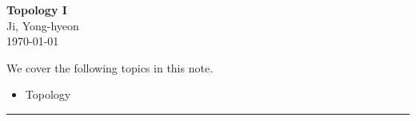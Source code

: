 \documentclass[11pt,openany]{article}
\begin{document}
\begin{center}
	\huge\textbf{Topology I}\\
	\vspace{0.5em}
	\large{Ji, Yong-hyeon}\\
	\vspace{0.5em}
	\normalsize{\today}\\
\end{center}

\noindent 
We cover the following topics in this note.
\begin{itemize}
	\item Topology
	
\end{itemize}
\hrule\vspace{12pt}
\end{document}
